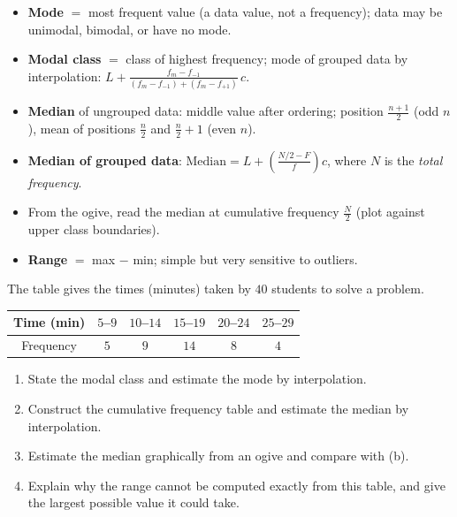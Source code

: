 \documentclass[11pt]{article}
\begin{document}
\begin{aretenir}
\begin{itemize}
\item \textbf{Mode} $=$ most frequent value (a data value, not a frequency); data may be unimodal, bimodal, or have no mode.
\item \textbf{Modal class} $=$ class of highest frequency; mode of grouped data by interpolation: $L + \frac{f_m - f_{-1}}{(f_m - f_{-1})+(f_m - f_{+1})}\,c$.
\item \textbf{Median} of ungrouped data: middle value after ordering; position $\frac{n+1}{2}$ (odd $n$), mean of positions $\frac{n}{2}$ and $\frac{n}{2}+1$ (even $n$).
\item \textbf{Median of grouped data}: $\text{Median} = L + \left(\frac{N/2 - F}{f}\right)c$, where $N$ is the \emph{total frequency}.
\item From the ogive, read the median at cumulative frequency $\frac{N}{2}$ (plot against upper class boundaries).
\item \textbf{Range} $=$ max $-$ min; simple but very sensitive to outliers.
\end{itemize}
\end{aretenir}

\begin{exercice}[Practice]
The table gives the times (minutes) taken by $40$ students to solve a problem.
\begin{center}
\begin{tabular}{|c|c|c|c|c|c|}
\hline
\rowcolor{popblueL} Time (min) & $5$--$9$ & $10$--$14$ & $15$--$19$ & $20$--$24$ & $25$--$29$ \\
\hline
Frequency & $5$ & $9$ & $14$ & $8$ & $4$ \\
\hline
\end{tabular}
\end{center}
\begin{enumerate}
\item State the modal class and estimate the mode by interpolation.
\item Construct the cumulative frequency table and estimate the median by interpolation.
\item Estimate the median graphically from an ogive and compare with (b).
\item Explain why the range cannot be computed exactly from this table, and give the largest possible value it could take.
\end{enumerate}
\end{exercice}
\end{document}
